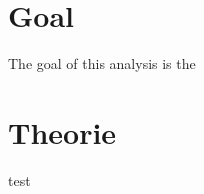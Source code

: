 \section{Goal}
The goal of this analysis is the 


\section{Theorie}
\label{sec:Theorie}
test
\cite{sample}
